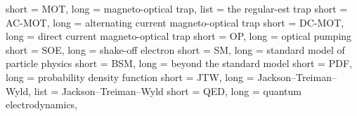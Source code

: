 % 
% 
% 

{
	short = MOT,
	long = magneto-optical trap,
	list = the regular-est trap
}
{
	short = AC-MOT,
	long = alternating current magneto-optical trap
}
{
	short = DC-MOT,
	long = direct current magneto-optical trap
}
{
	short = OP,
	long = optical pumping
}
{
	short = SOE,
	long = shake-off electron
}
{
	short = SM,
	long = standard model of particle physics
}
{
	short = BSM,
	long = beyond the standard model
}
{
	short = PDF,
	long = probability density function
}
{
	short = JTW,
	long = Jackson--Treiman--Wyld,
	list = Jackson--Treiman--Wyld \cite{jtw}\cite{jtw_coulomb}
}
{
	short = QED,
	long = quantum electrodynamics,
}